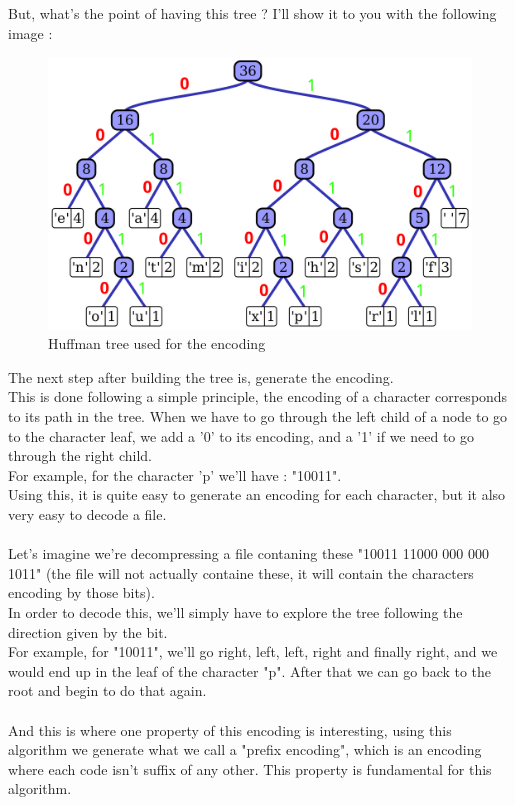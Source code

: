 But, what's the point of having this tree ? I'll show it to you with the following image :
\begin{figure}[H]
    \centering
    \includegraphics[scale=0.16]{img/huffmanTreeE.png}
    \caption{Huffman tree used for the encoding}
    \label{fig:my_label}
\end{figure}
The next step after building the tree is, generate the encoding.\\
This is done following a simple principle, the encoding of a character corresponds to its path in the tree. When we have to go through the left child of a node to go to the character leaf, we add a '0' to its encoding, and a '1' if we need to go through the right child.\\
For example, for the character 'p' we'll have : "10011".\\
Using this, it is quite easy to generate an encoding for each character, but it also very easy to decode a file.\\
\\
Let's imagine we're decompressing a file contaning these "10011 11000 000 000 1011" (the file will not actually containe these, it will contain the characters encoding by those bits).\\
In order to decode this, we'll simply have to explore the tree following the direction given by the bit.\\
For example, for "10011", we'll go right, left, left, right and finally right, and we would end up in the leaf of the character "p". After that we can go back to the root and begin to do that again.\\
\\
And this is where one property of this encoding is interesting, using this algorithm we generate what we call a "prefix encoding", which is an encoding where each code isn't suffix of any other. This property is fundamental for this algorithm.

